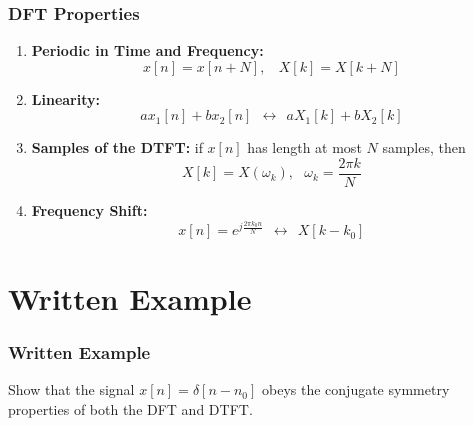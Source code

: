 \documentclass{beamer}
\begin{document}
\begin{frame}
  \frametitle{DFT Properties}

  \begin{enumerate}
  \item {\bf Periodic in Time and Frequency:}
    \begin{displaymath}
      x[n]=x[n+N],~~~~X[k]=X[k+N]
    \end{displaymath}
  \item {\bf Linearity:}
    \begin{displaymath}
      ax_1[n]+bx_2[n]~~\leftrightarrow~~aX_1[k]+bX_2[k]
    \end{displaymath}
  \item {\bf Samples of the DTFT:} if $x[n]$ has length at most $N$ samples, then
    \begin{displaymath}
      X[k] = X(\omega_k),~~~\omega_k=\frac{2\pi k}{N}
    \end{displaymath}
  \item {\bf Frequency Shift:}
    \begin{displaymath}
      x[n]=e^{j\frac{2\pi k_0 n}{N}} ~~\leftrightarrow~~X[k-k_0]
    \end{displaymath}
  \end{enumerate}
\end{frame}

\section[Written]{Written Example}
\setcounter{subsection}{1}


\begin{frame}
  \frametitle{Written  Example}

  Show that the signal $x[n]=\delta[n-n_0]$ obeys the conjugate
  symmetry properties of both the DFT and DTFT.
\end{frame}
\end{document}
